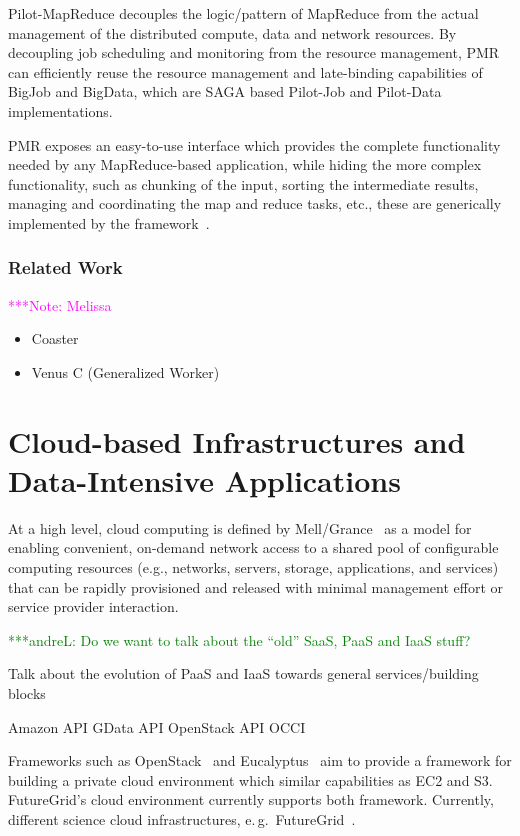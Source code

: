 \documentclass[times]{cpeauth}
\newcommand{\alnote}[1]{ {\textcolor{green} { ***andreL: #1 }}}
\newcommand{\note}[1]{ {\textcolor{magenta} { ***Note: #1 }}}
\newcommand{\alnote}[1]{}
\newcommand{\note}[1]{}
\begin{document}
Pilot-MapReduce decouples the logic/pattern of MapReduce from the actual
management of the distributed compute, data and network resources. By
decoupling job scheduling and monitoring from the resource management, PMR can
efficiently reuse the resource management and late-binding capabilities of
BigJob and BigData, which are SAGA based Pilot-Job and Pilot-Data
implementations.

PMR exposes an easy-to-use interface which provides the complete functionality
needed by any MapReduce-based application, while hiding the more complex
functionality, such as chunking of the input, sorting the intermediate
results, managing and coordinating the map and reduce tasks, etc., these are
generically implemented by the
framework~\cite{Mantha:2012:PEF:2287016.2287020}.



\subsubsection*{Related Work} 
\note{Melissa}

\begin{itemize}
	\item Coaster
	\item Venus C (Generalized Worker)
\end{itemize}


\section{Cloud-based Infrastructures and Data-Intensive Applications}

At a high level, cloud computing is defined by Mell/Grance~\cite{nist_cloud}
as a model for enabling convenient, on-demand network access to a shared pool
of configurable computing resources (e.g., networks, servers, storage,
applications, and services) that can be rapidly provisioned and released with
minimal management effort or service provider interaction.

\alnote{Do we want to talk about the ``old'' SaaS, PaaS and IaaS stuff?}

Talk about the evolution of PaaS and IaaS towards general services/building 
blocks

Amazon API
GData API
OpenStack API
OCCI


Frameworks such as OpenStack~\cite{openstack} and Eucalyptus~\cite{euca} aim
to provide a framework for building a private cloud environment which similar
capabilities as EC2 and S3. FutureGrid's cloud environment currently supports
both framework. Currently, different science cloud infrastructures, e.\,g.\ 
FutureGrid~\cite{futuregrid}.
\end{document}
